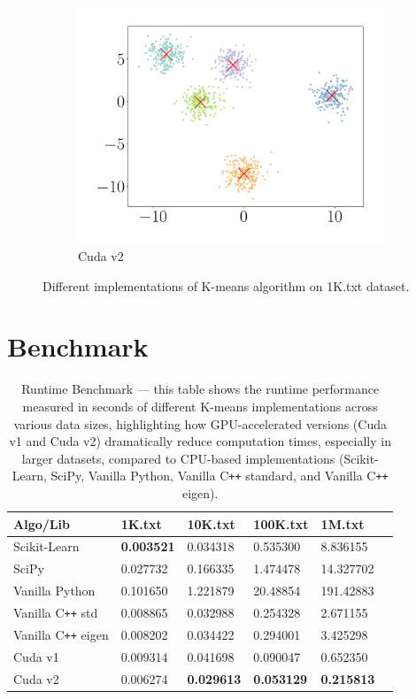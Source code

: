 \documentclass{article}
\begin{document}
\begin{figure}[H]
\begin{subfigure}[b]{0.32\linewidth}
      \includegraphics[scale=0.25]{figures/gpu2cc1K.pdf}
      \caption{\sc Cuda v2}
    \end{subfigure}
    \caption{Different implementations of {\sc K-means} algorithm on {\sf 1K.txt} dataset.}
  \end{figure}

  \section{Benchmark}
  \begin{table}[H]
    \centering
    \begin{tabular}{|P{4cm}|P{2.5cm}|P{2.5cm}|P{2.5cm}|P{2.5cm}|P{2.5cm}|}
      \hline
      {\sf Algo/Lib} & {\sf 1K.txt} & {\sf 10K.txt} & {\sf 100K.txt} & {\sf 1M.txt} \\ \hline
      {\sc Scikit-Learn} & {\bf 0.003521} & 0.034318 & 0.535300 & 8.836155 \\
      {\sc SciPy} & 0.027732 & 0.166335 & 1.474478 & 14.327702 \\
      {\sc Vanilla Python} & 0.101650 & 1.221879 & 20.48854 & 191.42883 \\
      {\sc Vanilla C{\tt++} std} & 0.008865 & 0.032988 & 0.254328 & 2.671155 \\
      {\sc Vanilla C{\tt++} eigen} & 0.008202 & 0.034422 & 0.294001 & 3.425298 \\
      {\sc Cuda v1} & 0.009314 & 0.041698 & 0.090047 & 0.652350 \\
      {\sc Cuda v2} & 0.006274 & {\bf 0.029613} & {\bf 0.053129} & {\bf 0.215813} \\ \hline
    \end{tabular}
    \caption{
      Runtime Benchmark --- this table shows the runtime performance measured in
      seconds of different {\sc K-means} implementations across various data sizes,
      highlighting how GPU-accelerated versions ({\sc Cuda v1} and {\sc Cuda v2})
      dramatically reduce computation times, especially in larger datasets, compared
      to CPU-based implementations ({\sc Scikit-Learn}, {\sc SciPy}, {\sc Vanilla
      Python}, {\sc Vanilla C{\tt++} standard}, and {\sc Vanilla C{\tt++} eigen}).
    }
    \label{tbl:runtime}
  \end{table}
\end{document}
